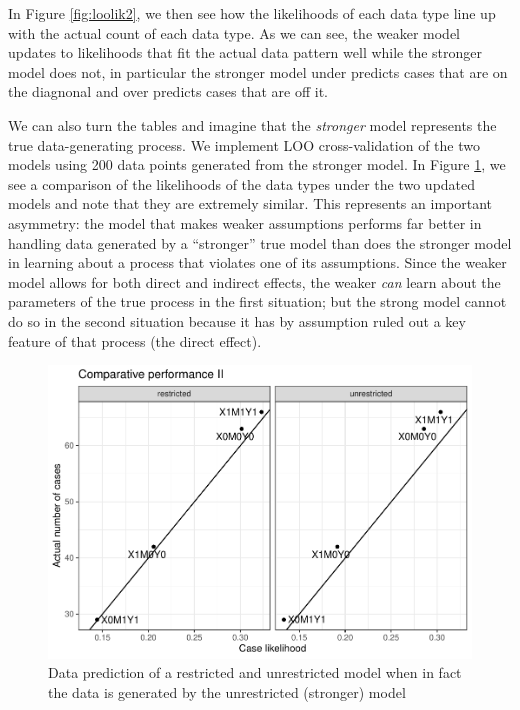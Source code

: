 \documentclass[
  12pt,
]{book}
\begin{document}
In Figure \ref{fig:loolik2}, we then see how the likelihoods of each data type line up with the actual count of each data type. As we can see, the weaker model updates to likelihoods that fit the actual data pattern well while the stronger model does not, in particular the stronger model under predicts cases that are on the diagnonal and over predicts cases that are off it.

We can also turn the tables and imagine that the \emph{stronger} model represents the true data-generating process. We implement LOO cross-validation of the two models using 200 data points generated from the stronger model. In Figure \ref{fig:loostronger}, we see a comparison of the likelihoods of the data types under the two updated models and note that they are extremely similar. This represents an important asymmetry: the model that makes weaker assumptions performs far better in handling data generated by a ``stronger'' true model than does the stronger model in learning about a process that violates one of its assumptions. Since the weaker model allows for both direct and indirect effects, the weaker \emph{can} learn about the parameters of the true process in the first situation; but the strong model cannot do so in the second situation because it has by assumption ruled out a key feature of that process (the direct effect).

\begin{figure}

{\centering \includegraphics{ii_files/figure-latex/loostronger-1} 

}

\caption{Data prediction of a restricted and unrestricted model when in fact the data is generated by the unrestricted (stronger) model}\label{fig:loostronger}
\end{figure}
\end{document}

